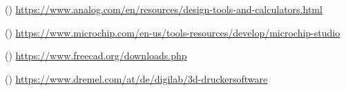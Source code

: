 \begin{table}[!ht]
\begin{threeparttable}
\begin{tablenotes}
\setcounter{softwaretnotecounter}{0}
\ifsoftwarepagelineartechnology
      \item[(\thesoftwaretnotecounter)] \url{https://www.analog.com/en/resources/design-tools-and-calculators.html}
\fi
\ifsoftwarepagemicrochipstudio
      \item[(\thesoftwaretnotecounter)] \url{https://www.microchip.com/en-us/tools-resources/develop/microchip-studio}
\fi
\ifsoftwarepagefreecad
      \item[(\thesoftwaretnotecounter)] \url{https://www.freecad.org/downloads.php}
\fi
\ifsoftwarepagedremeldigilabslicer
      \item[(\thesoftwaretnotecounter)] \url{https://www.dremel.com/at/de/digilab/3d-druckersoftware}  
\fi
    \end{tablenotes}
  \end{threeparttable}
\end{table}